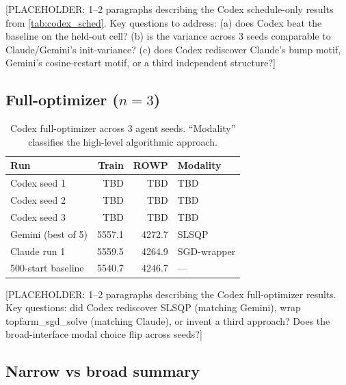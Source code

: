 \documentclass{article}
\providecommand{\CodexFullTrainSI}{TBD}
\providecommand{\CodexFullTrainSII}{TBD}
\providecommand{\CodexFullTrainSIII}{TBD}
\providecommand{\CodexFullRowpSI}{TBD}
\providecommand{\CodexFullRowpSII}{TBD}
\providecommand{\CodexFullRowpSIII}{TBD}
\providecommand{\CodexFullModalSI}{TBD}
\providecommand{\CodexFullModalSII}{TBD}
\providecommand{\CodexFullModalSIII}{TBD}
\begin{document}
[PLACEHOLDER: 1--2 paragraphs describing the Codex schedule-only
results from \cref{tab:codex_sched}. Key questions to address:
(a) does Codex beat the baseline on the held-out cell?
(b) is the variance across 3 seeds comparable to Claude/Gemini's
init-variance?
(c) does Codex rediscover Claude's bump motif, Gemini's cosine-restart
motif, or a third independent structure?]

\subsection{Full-optimizer ($n=3$)}

\begin{table}[t]
\caption{Codex full-optimizer across 3 agent seeds. ``Modality''
classifies the high-level algorithmic approach.}
\label{tab:codex_full}
\vskip 0.1in
\begin{center}
\begin{small}
\begin{sc}
\begin{tabular}{lrrl}
\toprule
Run                     & Train  & ROWP    & Modality \\
\midrule
Codex seed 1            & \CodexFullTrainSI   & \CodexFullRowpSI    & \CodexFullModalSI   \\
Codex seed 2            & \CodexFullTrainSII  & \CodexFullRowpSII   & \CodexFullModalSII  \\
Codex seed 3            & \CodexFullTrainSIII & \CodexFullRowpSIII  & \CodexFullModalSIII \\
\midrule
Gemini (best of 5)      & 5557.1 & 4272.7  & SLSQP \\
Claude run 1            & 5559.5 & 4264.9  & SGD-wrapper \\
500-start baseline      & 5540.7 & 4246.7  & ---  \\
\bottomrule
\end{tabular}
\end{sc}
\end{small}
\end{center}
\vskip -0.1in
\end{table}

[PLACEHOLDER: 1--2 paragraphs describing the Codex full-optimizer
results. Key questions: did Codex rediscover SLSQP (matching Gemini),
wrap topfarm\_sgd\_solve (matching Claude), or invent a third
approach? Does the broad-interface modal choice flip across seeds?]

\subsection{Narrow vs broad summary}
\end{document}
